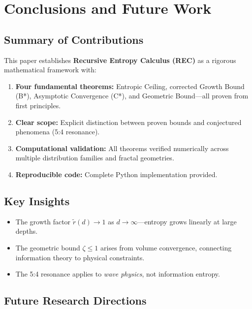 \documentclass[11pt,a4paper]{article}
\theoremstyle{definition}
\theoremstyle{remark}
\newcommand{\rtilde}{\tilde{r}}
\begin{document}
\section{Conclusions and Future Work}
\label{sec:conclusion}

\subsection{Summary of Contributions}

This paper establishes \textbf{Recursive Entropy Calculus (REC)} as a rigorous mathematical framework with:

\begin{enumerate}
    \item \textbf{Four fundamental theorems:} Entropic Ceiling, corrected Growth Bound (B*), Asymptotic Convergence (C*), and Geometric Bound---all proven from first principles.
    
    \item \textbf{Clear scope:} Explicit distinction between proven bounds and conjectured phenomena (5:4 resonance).
    
    \item \textbf{Computational validation:} All theorems verified numerically across multiple distribution families and fractal geometries.
    
    \item \textbf{Reproducible code:} Complete Python implementation provided.
\end{enumerate}

\subsection{Key Insights}

\begin{itemize}
    \item The growth factor $\rtilde(d) \to 1$ as $d \to \infty$---entropy grows linearly at large depths.
    \item The geometric bound $\zeta \leq 1$ arises from volume convergence, connecting information theory to physical constraints.
    \item The 5:4 resonance applies to \emph{wave physics}, not information entropy.
\end{itemize}

\subsection{Future Research Directions}
\end{document}
